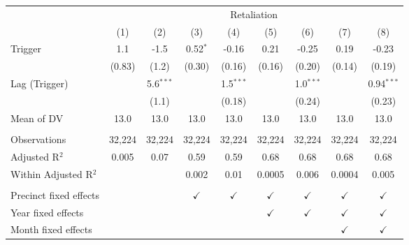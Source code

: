 \begingroup \centering \begin{tabular}{lcccccccc}    \toprule     & \multicolumn{8}{c}{Retaliation}\\                           & (1)    & (2)         & (3)           & (4)           & (5)           & (6)           & (7)           & (8)\\      \midrule     Trigger                & 1.1    & -1.5        & 0.52$^{*}$    & -0.16         & 0.21          & -0.25         & 0.19          & -0.23\\                              & (0.83) & (1.2)       & (0.30)        & (0.16)        & (0.16)        & (0.20)        & (0.14)        & (0.19)\\       Lag (Trigger)          &        & 5.6$^{***}$ &               & 1.5$^{***}$   &               & 1.0$^{***}$   &               & 0.94$^{***}$\\                              &        & (1.1)       &               & (0.18)        &               & (0.24)        &               & (0.23)\\       Mean of DV             & 13.0   & 13.0        & 13.0          & 13.0          & 13.0          & 13.0          & 13.0          & 13.0\\       \\    Observations           & 32,224 & 32,224      & 32,224        & 32,224        & 32,224        & 32,224        & 32,224        & 32,224\\      Adjusted R$^2$         & 0.005  & 0.07        & 0.59          & 0.59          & 0.68          & 0.68          & 0.68          & 0.68\\      Within Adjusted R$^2$  &        &             & 0.002         & 0.01          & 0.0005        & 0.006         & 0.0004        & 0.005\\       \\    Precinct fixed effects &        &             & $\checkmark$  & $\checkmark$  & $\checkmark$  & $\checkmark$  & $\checkmark$  & $\checkmark$\\       Year fixed effects     &        &             &               &               & $\checkmark$  & $\checkmark$  & $\checkmark$  & $\checkmark$\\       Month fixed effects    &        &             &               &               &               &               & $\checkmark$  & $\checkmark$\\       \bottomrule \end{tabular} \par\endgroup